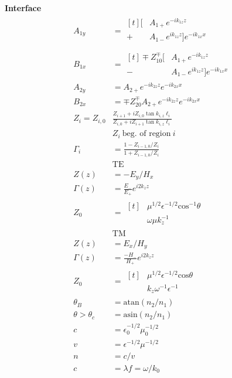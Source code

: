 \documentclass[12pt]{article}
\begin{document}
\begin{multicols}{3}
\textbf{Interface}
\begin{align}
  A_{1y} &= \begin{aligned}[t]
    [ &A_{1+}e^{-ik_{1z}z} \\
    + &A_{1-}e^{ik_{1z}z}]e^{-ik_{1x}x}\\
  \end{aligned}\\
  B_{1x} &= \begin{aligned}[t]
    \mp Z_{10}^{\mp}[&A_{1+}e^{-ik_{1z}z} \\
      - &A_{1-}e^{ik_{1z}z}]e^{-ik_{1x}x}
  \end{aligned}\\
  A_{2y} &= A_{2+}e^{-ik_{2z}z}e^{-ik_{2x}x}\\
  B_{2x} &=\mp Z_{20}^{\mp}A_{2+}e^{-ik_{2z}z}e^{-ik_{2x}x}\\
  Z_i = Z_{i, 0}&\frac{Z_{i + 1} + i Z_{i, 0}\tan k_{i,z} \ell_i}{Z_{i, 0} + iZ_{i + 1}\tan k_{i,z} \ell_i}\\
  &Z_i \ \textrm{beg. of region} \ i \\
  \Gamma_i &= \frac{1 - Z_{i - 1, 0}/Z_{i}}{1 + Z_{i - 1, 0}/Z_{i}}\\
  &\textrm{TE}\\
  Z(z) &= -E_y/H_x\\
  \Gamma(z) &= \frac{E_-}{E_+} e^{i2k_zz}\\
  Z_0 &= \begin{aligned}[t]
    &\mu^{1/2}\epsilon^{-1/2}\textrm{cos}^{-1}\theta\\
    &\omega\mu k_z^{-1}
  \end{aligned}\\
  &\textrm{TM}\\
  Z(z) &= E_x/H_y\\
  \Gamma(z) &= \frac{-H_-}{H_+} e^{i2k_zz}\\
  Z_0 &= \begin{aligned}[t]
    &\mu^{1/2}\epsilon^{-1/2}\textrm{cos}\theta\\
    &k_z\omega^{-1}\epsilon^{-1}
  \end{aligned}\\
  \theta_B &= \textrm{atan}(n_2/n_1)\\
  \theta > \theta_c &= \textrm{asin}(n_2/n_1)\\
  c &= \epsilon^{-1/2}_0\mu^{-1/2}_0\\
  v &= \epsilon^{-1/2}\mu^{-1/2}\\
  n &= c/v\\
  c &= \lambda f = \omega/k_0
\end{align}


\end{multicols}
\end{document}
